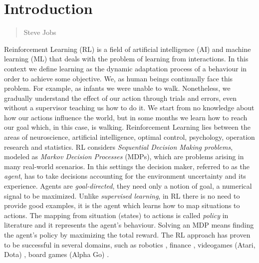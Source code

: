 \chapter{Introduction}
\label{Introduction}
\thispagestyle{empty}

\begin{quotation}
{\footnotesize
{}
\begin{flushright}
Steve Jobs
\end{flushright}
}
\end{quotation}
\vspace{0.5cm}

Reinforcement Learning \citep{sutton_introduction} (RL) is a field of artificial intelligence (AI) and machine learning (ML) that deals with the problem of learning from interactions. In this context we define learning as the dynamic adaptation process of a behaviour in order to achieve some objective. We, as human beings continually face this problem. For example, as infants we were unable to walk. Nonetheless, we gradually understand the effect of our action through trials and errors, even without a supervisor teaching us how to do it. We start from no knowledge about how our actions influence the world, but in some months we learn how to reach our goal which, in this case, is walking. \newline
Reinforcement Learning lies between the areas of neuroscience, artificial intelligence, optimal control, psychology, operation research and statistics. 
RL considers \textit{Sequential Decision Making problems}, modeled as \textit{Markov Decision Processes} \citep{Puterman:1994:MDP:528623} (MDPs), which are problems arising in many real-world scenarios. In this settings the decision maker, referred to as the \textit{agent}, has to take decisions accounting for the environment uncertainty and its experience.
Agents are \textit{goal-directed}, they need only a notion of goal, a numerical signal to be maximized. Unlike \textit{supervised learning}, in RL there is no need to provide good examples, it is the agent which learns how to map situations to actions. 
The mapping from situation (states) to actions is called \textit{policy} in literature and it represents the agent's behaviour.
Solving an MDP means finding the agent's policy by maximizing the total reward. \newline
The RL approach has proven to be successful in several domains, such as robotics \citep{rl-robotics}, finance \citep{rl-finance}, videogames (Atari, Dota) \citep{rl-atari-1, rl-atari-2, rl-atari-3}, board games (Alpha Go) \citep{alpha-go, alpha-zero}.
